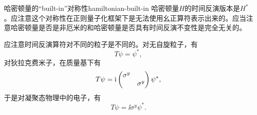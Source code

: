 \begin{back}{哈密顿量的“built-in”对称性}{hamiltonian-built-in}
    哈密顿量$H$的时间反演版本是$H^*$。应注意这个对称性在正则量子化框架下是无法使用幺正算符表示出来的。应当注意哈密顿量是否是非厄米的和哈密顿量是否具有时间反演不变性是完全无关的。 
    
    应注意时间反演算符对不同的粒子是不同的。对无自旋粒子，有
    \begin{equation}
        T \psi = \psi^*,
    \end{equation}
    对狄拉克费米子，在质量基下有
    \begin{equation}
        T \psi = \ii \pmqty{\dmat{\sigma^y, \sigma^y}} \psi^*,
    \end{equation}
    于是对凝聚态物理中的电子，有
    \begin{equation}
        T \psi = \ii \sigma^y \psi^*.
    \end{equation}
\end{back}

